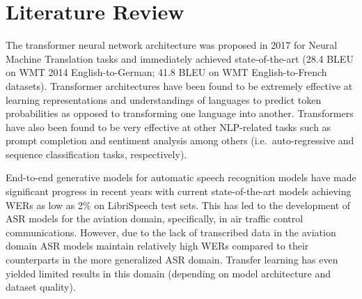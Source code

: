 \documentclass[12pt]{article}
\begin{document}
\section{Literature Review}\label{sec:lit_review}
The transformer neural network architecture was proposed in 2017 for Neural Machine Translation tasks and immediately achieved
state-of-the-art (28.4 BLEU on WMT 2014 English-to-German; 41.8 BLEU on WMT English-to-French datasets)\cite{vaswani_attention_2017}. Transformer
architectures have been found to be extremely effective at learning representations and understandings of languages to predict token probabilities as
opposed to transforming one language into another\cite{devlin_bert_2019,liu_roberta_2019}. Transformers have also been found to be very effective at
other NLP-related tasks such as prompt completion and sentiment analysis among others (i.e.~auto-regressive and sequence classification tasks,
respectively)\cite{lewis_bart_2019,radford_improving_2018}.


End-to-end generative models for automatic speech recognition models have made significant progress in recent years with current state-of-the-art
models achieving WERs as low as 2\% on LibriSpeech test sets\cite{han_contextnet_2020,kriman_quartznet_2020,baevski_wav2vec_2020,li_jasper_2019}.
This has led to the development of ASR models for the aviation domain, specifically, in air traffic control communications\cite{badrinath_automatic_2022,smidl_air_2019,zuluaga-gomez_automatic_2020,srinivasamurthy_semi-supervised_2017}. However, due to the lack of
transcribed data in the aviation domain\cite{zuluaga-gomez_automatic_2020,srinivasamurthy_semi-supervised_2017,badrinath_automatic_2022,smidl_air_2019}
ASR models maintain relatively high WERs compared to their counterparts in the more generalized ASR domain\cite{zuluaga-gomez_automatic_2020,badrinath_automatic_2022}. Transfer learning has even yielded limited results in this domain (depending on model
architecture and dataset quality)\cite{badrinath_automatic_2022,zuluaga-gomez_automatic_2020}.
\end{document}
